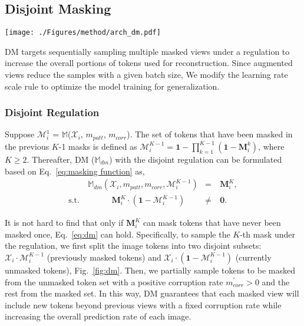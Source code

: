 \documentclass[lettersize,journal]{IEEEtran}
\begin{document}
\subsection{Disjoint Masking}

\label{sec:dm}
\begin{figure*}[!t]
  \centering
  \texttt{[image: ./Figures/method/arch\_dm.pdf]}
  \caption{Illustration of disjoint masking. With DM, we sequentially sample the $K$-th view from disjoint regions of the currently have not been masked token set $\mathcal{X}_{i} \cdot \mathcal{M}_{i}^{K-1}$ and the rest part $\mathcal{X}_{i} \cdot (\bm{1}-\mathcal{M}_{i}^{K-1})$ with the disjoint regulation, \textit{i.e.}, keeping the corruption rate $m^{'}_{corr}$ in $\mathcal{X}_{i} \cdot (\bm{1}-\mathcal{M}_{i}^{K-1})$ positive. The regulation ensures the overall prediction rate of each image is larger than the pre-defined corruption rate.}
  \label{fig:dm}
\end{figure*}
DM targets sequentially sampling multiple masked views under a regulation to increase the overall portions of tokens used for reconstruction. Since augmented views reduce the samples with a given batch size, We modify the learning rate scale rule to optimize the model training for generalization.

\subsubsection{Disjoint Regulation}
Suppose $\mathcal{M}_{i}^{1}$ = $\mathbb{M}$($\mathcal{X}_{i}$, $m_{patt}$, $m_{corr}$). The set of tokens that have been masked in the previous $K$-1 masks is defined as $\mathcal{M}_{i}^{K-1} = \bm{1}- \prod \limits_{k=1}^{K-1} (\bm{1}-\bm{M}_{i}^{k})$, where $K \geq 2$. Thereafter, DM ($\mathbb{M}_{dm}$) with the disjoint regulation can be formulated based on Eq.~\ref{eq:masking function} as,
\begin{equation}
    \begin{aligned}
        & \mathbb{M}_{dm}(\mathcal{X}_{i}, m_{patt}, m_{corr}, \mathcal{M}_{i}^{K-1})&=& \ \bm{M}_{i}^K, \\
     \text{s.t.}\ &\ \ \ \ \ \ \ \ \ \ \ \ \ \bm{M}_{i}^{K} \cdot (\bm{1} - \mathcal{M}_{i}^{K-1}) &\ne& \ \bm{0}.
    \end{aligned}
    \label{eq:dm}
\end{equation}

It is not hard to find that only if $\bm{M}_{i}^K$ can mask tokens that have never been masked once, Eq.~\ref{eq:dm} can hold. 
Specifically, to sample the $K$-th mask under the regulation, we first split the image tokens into two disjoint subsets: $\mathcal{X}_{i} \cdot \mathcal{M}_{i}^{K-1}$ (previously masked tokens) and $\mathcal{X}_{i} \cdot (\bm{1}-\mathcal{M}_{i}^{K-1})$ (currently unmasked tokens), Fig.~\ref{fig:dm}.
Then, we partially sample tokens to be masked from the unmasked token set with a positive corruption rate $m^{'}_{corr}>0$ and the rest from the masked set.
In this way, DM guarantees that each masked view will include new tokens beyond previous views with a fixed corruption rate while increasing the overall prediction rate of each image. 
\end{document}
